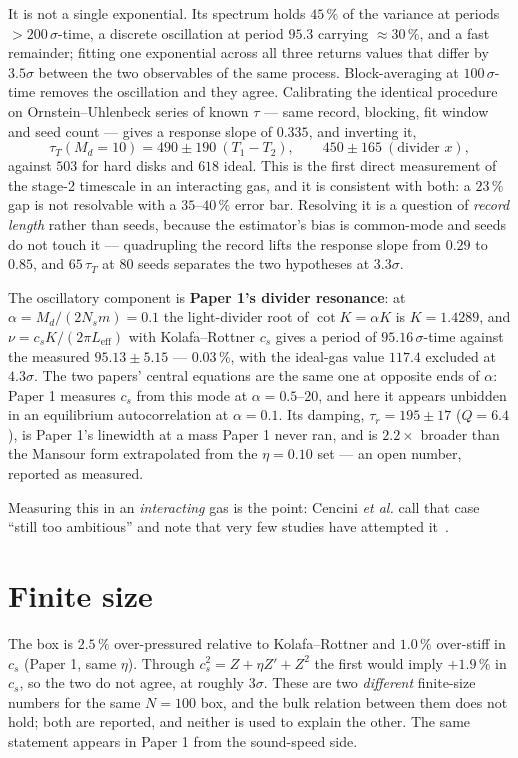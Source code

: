 \documentclass[journal]{IEEEtran}
\begin{document}
It is not a single exponential. Its spectrum holds $45\,\%$ of the variance at periods
$>200\,\sigma$-time, a discrete oscillation at period $95.3$ carrying $\approx 30\,\%$, and a fast
remainder; fitting one exponential across all three returns values that differ by $3.5\sigma$
between the two observables of the same process. Block-averaging at $100\,\sigma$-time removes the
oscillation and they agree. Calibrating the identical procedure on Ornstein--Uhlenbeck series of
known $\tau$ --- same record, blocking, fit window and seed count --- gives a response slope of
$0.335$, and inverting it,
\[
\tau_T(M_d\!=\!10) = 490 \pm 190\ (T_1{-}T_2),\qquad 450 \pm 165\ (\text{divider }x),
\]
against $503$ for hard disks and $618$ ideal. This is the first direct measurement of the stage-2
timescale in an interacting gas, and it is consistent with both: a $23\,\%$ gap is not resolvable
with a $35$--$40\,\%$ error bar. Resolving it is a question of \emph{record length} rather than
seeds, because the estimator's bias is common-mode and seeds do not touch it --- quadrupling the
record lifts the response slope from $0.29$ to $0.85$, and $65\,\tau_T$ at 80 seeds separates the
two hypotheses at $3.3\sigma$.

The oscillatory component is \textbf{Paper 1's divider resonance}: at $\alpha = M_d/(2N_sm) = 0.1$
the light-divider root of $\cot K = \alpha K$ is $K = 1.4289$, and
$\nu = c_sK/(2\pi L_{\mathrm{eff}})$ with Kolafa--Rottner $c_s$ gives a period of $95.16\,\sigma$-time
against the measured $95.13 \pm 5.15$ --- $0.03\,\%$, with the ideal-gas value $117.4$ excluded at
$4.3\sigma$. The two papers' central equations are the same one at opposite ends of $\alpha$:
Paper 1 measures $c_s$ from this mode at $\alpha = 0.5$--$20$, and here it appears unbidden in an
equilibrium autocorrelation at $\alpha = 0.1$. Its damping, $\tau_r = 195 \pm 17$ ($Q = 6.4$), is
Paper 1's linewidth at a mass Paper 1 never ran, and is $2.2\times$ broader than the Mansour form
extrapolated from the $\eta = 0.10$ set --- an open number, reported as measured.

Measuring this in an \emph{interacting} gas is the point: Cencini \emph{et al.} call that case
``still too ambitious'' and note that very few studies have attempted it~\cite{cencini2007}.

\section{Finite size}\label{sec:finitesize}
The box is $\mathbf{2.5\,\%}$ over-pressured relative to Kolafa--Rottner and $\mathbf{1.0\,\%}$
over-stiff in $c_s$ (Paper 1, same $\eta$). Through $c_s^2 = Z + \eta Z' + Z^2$ the first would
imply $+1.9\,\%$ in $c_s$, so the two do not agree, at roughly $3\sigma$. These are two
\emph{different} finite-size numbers for the same $N = 100$ box, and the bulk relation between them
does not hold; both are reported, and neither is used to explain the other. The same statement
appears in Paper 1 from the sound-speed side.
\end{document}
